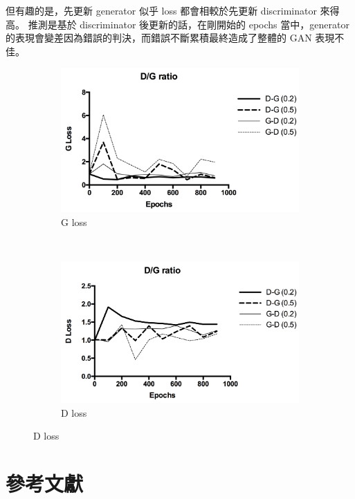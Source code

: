 \documentclass[final,3p]{elsarticle}
\begin{document}
	但有趣的是，先更新 generator 似乎 loss 都會相較於先更新 discriminator 來得高。
	推測是基於 discriminator 後更新的話，在剛開始的 epochs 當中，generator 的表現會變差因為錯誤的判決，而錯誤不斷累積最終造成了整體的 GAN 表現不佳。
	\begin{figure}[H]
		\centering
		\begin{subfigure}{.48\textwidth}
			\centering
			\includegraphics[width=\linewidth]{images/g_loss_dg_gd}
			\caption{G loss}
		\end{subfigure}
		~
		\begin{subfigure}{.48\textwidth}
			\centering
			\includegraphics[width=\linewidth]{images/d_loss_dg_gd}
			\caption{D loss}
		\end{subfigure}
		\label{fig:dg_gd_loss}
	\end{figure}
		



\section{參考文獻}


	
\end{document}
